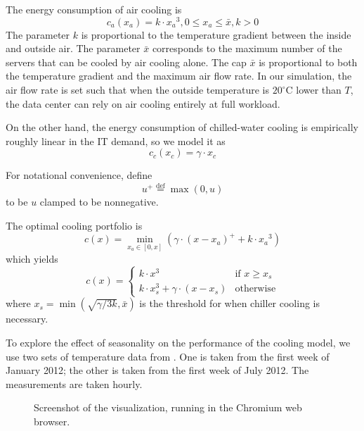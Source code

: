 \documentclass{acm_proc_article-sp}
\newcommand{\eqdef}{\ensuremath{\overset{\mathrm{def}}{=}}}
\begin{document}
The energy consumption of air cooling is
\begin{equation}
c_a(x_a) = k \cdot {x_a}^3, 0 \leq x_a \leq \bar{x}, k > 0
\end{equation}
The parameter $k$ is proportional to the temperature gradient between the inside and outside air. The parameter $\bar{x}$ corresponds to the maximum number of the servers that can be cooled by air cooling alone. The cap $\bar{x}$ is proportional to both the temperature gradient and the maximum air flow rate. In our simulation, the air flow rate is set such that when the outside temperature is $20^{\circ}\mathrm{C}$ lower than $T$, the data center can rely on air cooling entirely at full workload.

On the other hand, the energy consumption of chilled-water cooling is empirically roughly linear in the IT demand, so we model it as
\begin{equation}
c_c(x_c) = \gamma \cdot x_c
\end{equation}

For notational convenience, define
\begin{equation}
	u^+ \eqdef \max(0, u)
\end{equation}
to be $u$ clamped to be nonnegative.

The optimal cooling portfolio is
\begin{equation}
c(x) = \min_{x_a \in [0,x]}\left( \gamma \cdot (x-x_a)^+ + k \cdot {x_a}^3 \right)
\end{equation}
which yields
$$
c(x) = \left\{ \begin{array}{ll}
	k \cdot x^3 & \mbox{if $x \geq x_s$}\\
	k \cdot x_s^3 + \gamma \cdot (x-x_s) & \mbox{otherwise}\end{array} \right.
$$
where $x_s = \min \left(\sqrt{\gamma/3k}, \bar{x}\right)$ is the threshold for when chiller cooling is necessary.

To explore the effect of seasonality on the performance of the cooling model, we use two sets of temperature data from \cite{temp}. One is taken from the first week of January 2012; the other is taken from the first week of July 2012. The measurements are taken hourly.

\begin{figure*}
\centering
{}
\caption{Screenshot of the visualization, running in the Chromium web browser.}
\end{figure*}
\end{document}
